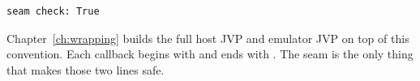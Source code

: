 \begin{lstlisting}[style=grailOutStyle]
seam check: True
\end{lstlisting}


Chapter~\ref{ch:wrapping} builds the full host JVP and emulator JVP on top
of this convention.
Each callback begins with  and ends
with .
The seam is the only thing that makes those two lines safe.
